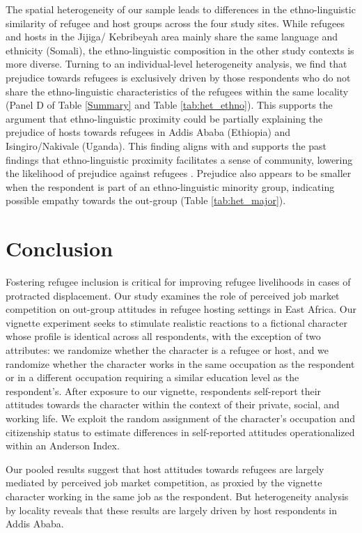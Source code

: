 \documentclass[a4paper,12pt]{article}
\begin{document}
 The spatial heterogeneity of our sample leads to differences in the ethno-linguistic similarity of refugee and host groups across the four study sites. While refugees and hosts in the Jijiga/ Kebribeyah area mainly share the same language and ethnicity (Somali), the ethno-linguistic composition in the other study contexts is more diverse. Turning to an individual-level heterogeneity analysis, we find that prejudice towards refugees is exclusively driven by those respondents who do not share the ethno-linguistic characteristics of the refugees within the same locality (Panel D of Table \ref{Summary} and Table \ref{tab:het_ethno}). This supports the argument that ethno-linguistic proximity could be partially explaining the prejudice of hosts towards refugees in Addis Ababa (Ethiopia) and Isingiro/Nakivale (Uganda). This finding aligns with and supports the past findings that ethno-linguistic proximity facilitates a sense of community, lowering the likelihood of prejudice against refugees \citep{de2023refugee, betts2023refugees, hynie2016social}. Prejudice also appears to be smaller when the respondent is part of an ethno-linguistic minority group, indicating possible empathy towards the out-group (Table \ref{tab:het_major}).


\section{Conclusion}

\noindent Fostering refugee inclusion is critical for improving refugee livelihoods in cases of protracted displacement. Our study examines the role of perceived job market competition on out-group attitudes in refugee hosting settings in East Africa. Our vignette experiment seeks to stimulate realistic reactions to a fictional character whose profile is identical across all respondents, with the exception of two attributes: we randomize whether the character is a refugee or host, and we randomize whether the character works in the same occupation as the respondent or in a different occupation requiring a similar education level as the respondent's. After exposure to our vignette, respondents self-report their attitudes towards the character within the context of their private, social, and working life. We exploit the random assignment of the character's occupation and citizenship status to estimate differences in self-reported attitudes operationalized within an Anderson Index.

Our pooled results suggest that host attitudes towards refugees are largely mediated by perceived job market competition, as proxied by the vignette character working in the same job as the respondent. But heterogeneity analysis by locality reveals that these results are largely driven by host respondents in Addis Ababa. 
\end{document}
